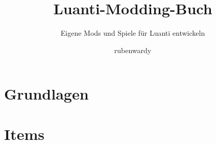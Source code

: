 \documentclass[
  paper=a4,
  fontsize=12pt,
  twoside,
  BCOR=8mm,
  DIV=calc,
  headings=small,
  parskip=half-,
  footnotes=multiple,
  numbers=noendperiod,
  ngerman,
]{scrbook}
\begin{document}
\frontmatter

\extratitle{\centering\vspace*{0.3\textheight}
  {\Huge Luanti-Modding-Buch}}
\titlehead{}
\title{Luanti-Modding-Buch}
\subtitle{Eigene Mods und Spiele für Luanti entwickeln}
\author{rubenwardy}
\publishers{%
  \normalsize
  Lektorat: Shara}
\date{}

\uppertitleback{}
\lowertitleback{\small
  \textbf{Luanti-Modding-Buch}\\
  Originaltitel: \emph{Luanti Modding Book}\\[1ex]
  Text: rubenwardy, \url{https://rubenwardy.com}\\[1ex]
  Quelle: \url{https://gitlab.com/rubenwardy/minetest_modding_book}\\
  Stand der Quelle: Commit b3904f8 (23.\,10.\,2026)\\[1ex]
  Dieses Werk ist lizenziert unter der Creative-Commons-Lizenz
  \enquote{Namensnennung -- Weitergabe unter gleichen Bedingungen 4.0
  International} (CC BY-SA 4.0):\\
  \url{https://creativecommons.org/licenses/by-sa/4.0/deed.de}\\[1ex]
  Die deutsche Übersetzung wurde für diese Ausgabe aus dem englischen
  Original erstellt. Die Bezeichnung \enquote{Minetest} wurde
  durchgehend auf \enquote{Luanti}, der API-Namensraum \texttt{minetest} auf
  \texttt{core} aktualisiert.\\[1ex]
  Gesetzt aus der IBM Plex mit \LaTeX{} und KOMA-Script.}

\maketitle

\tableofcontents



\mainmatter

\part{Grundlagen}



\part{Items}





\end{document}
